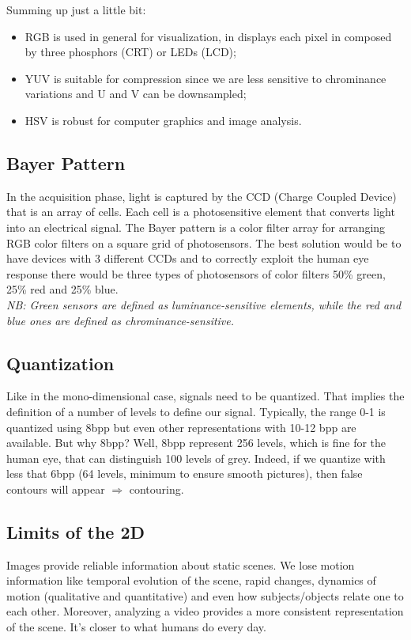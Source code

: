 Summing up just a little bit:
\begin{itemize}
    \item RGB is used in general for visualization, in displays each pixel in composed by three phosphors (CRT) or LEDs (LCD);
    \item YUV is suitable for compression since we are less sensitive to chrominance variations and U and V can be downsampled;
    \item HSV is robust for computer graphics and image analysis.
\end{itemize}

\subsection{Bayer Pattern}
In the acquisition phase, light is captured by the CCD (Charge Coupled Device) that is an array of cells. Each cell is a photosensitive element that converts light into an electrical signal.
The Bayer pattern is a color filter array for arranging RGB color filters on a square grid of photosensors. The best solution would be to have devices with 3 different CCDs and to correctly exploit the human eye response there would be three types of photosensors of color filters 50\% green, 25\% red and 25\% blue.
\\\textit{NB: Green sensors are defined as luminance-sensitive elements, while the red and blue ones are defined as chrominance-sensitive.}
\subsection{Quantization}
Like in the mono-dimensional case, signals need to be quantized. That implies the definition of a number of levels to define our signal. Typically, the range 0-1 is quantized using 8bpp but even other representations with 10-12 bpp are available.
But why 8bpp? Well, 8bpp represent 256 levels, which is fine for the human eye, that can distinguish 100 levels of grey. Indeed, if we quantize with less that 6bpp (64 levels, minimum to ensure smooth pictures), then false contours will appear $\Rightarrow$ contouring.
\subsection{Limits of the 2D}
Images provide reliable information about static scenes.
We lose motion information like temporal evolution of the scene, rapid changes, dynamics of motion (qualitative and quantitative) and even how subjects/objects relate one to each other.
Moreover, analyzing a video provides a more consistent representation of the scene.
It’s closer to what humans do every day.

